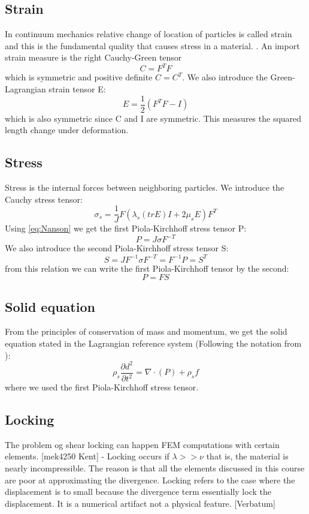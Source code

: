 \subsection*{Strain}
In continuum mechanics relative change of location of particles is called strain and this is the fundamental quality that causes stress in a material. \cite{Richter2016}. An import strain measure is the right Cauchy-Green tensor 
$$C = F^TF$$ 
which is symmetric and positive definite $C = C^T$.  We also introduce the Green-Lagrangian strain tensor E:
$$E = \frac{1}{2}(F^TF -I) $$
which is also symmetric since C and I are symmetric. This measures the squared length change under deformation.
		
\subsection*{Stress}
Stress is the internal forces between neighboring particles. We introduce the Cauchy stress tensor:
\begin{equation}
 \sigma_s = \frac{1}{J} F(\lambda_s (tr E)I + 2\mu_sE) F^T
\end{equation}
Using \eqref{eq:Nanson} we get the first Piola-Kirchhoff stress tensor P:
\begin{equation}
 P = J \sigma F^{-T} 
\end{equation}
We also introduce the second Piola-Kirchhoff stress tensor S:
\begin{equation}
S = J F^{-1}\sigma F^{-T} = F^{-1} P = S^T 
\end{equation}
from this relation we can write the first Piola-Kirchhoff tensor by the second:
\begin{equation}
P = FS
\end{equation}
\subsection*{Solid equation}
From the principles of conservation of mass and momentum, we get the solid equation stated in the Lagrangian reference system (Following the notation from \cite{Richter2016}):
\begin{equation}\label{eq:Solid}
\rho_s \frac{\partial d^2}{\partial t^2} = \nabla \cdot ( P ) + \rho_s f 
\end{equation}
where we used the first Piola-Kirchhoff stress tensor.

\subsection*{Locking}
The problem og shear locking can happen FEM computations with certain elements. 
[mek4250 Kent] - Locking occurs if  $ \lambda >> \nu $ that is, the material is nearly incompressible. The reason is that all the elements discussed in this course are poor at approximating the divergence. Locking refers to the case where the displacement is to small because the divergence term essentially lock the displacement. It is a numerical artifact not a physical feature. [Verbatum]






